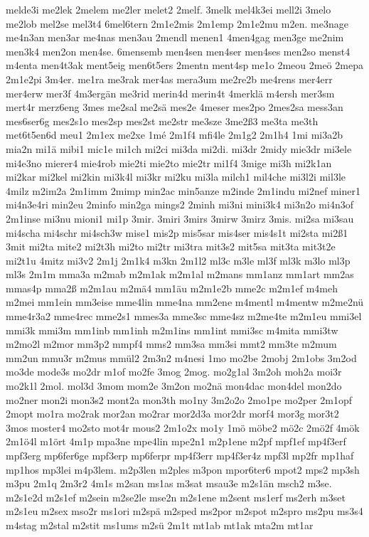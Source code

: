 {melde3i
me2lek
2melem
me2ler
melet2
2melf.
3melk
mel4k3ei
mell2i
3melo
me2lob
mel2se
mel3t4
6mel6tern
2m1e2mis
2m1emp
2m1e2mu
m2en.
me3nage
me4n3an
men3ar
me4nas
men3au
2mendl
menen1
4men4gag
men3ge
me2nim
men3k4
men2on
men4se.
6mensemb
men4sen
men4ser
men4ses
men2so
menst4
m4enta
men4t3ak
ment5eig
men6t5ers
2mentn
ment4sp
me1o
2meou
2meö
2mepa
2m1e2pi
3m4er.
me1ra
me3rak
mer4as
mera3um
me2re2b
me4rens
mer4err
mer4erw
mer3f
4m3ergän
me3rid
merin4d
merin4t
4merklä
m4ersh
mer3sm
mert4r
merz6eng
3mes
me2sal
me2sä
mes2e
4meser
mes2po
2mes2sa
mess3an
mes6ser6g
mes2s1o
mes2sp
mes2st
me2str
me3sze
3me2ß3
me3ta
me3th
met6t5en6d
meu1
2m1ex
me2xe
1mé
2m1f4
mfi4le
2m1g2
2m1h4
1mi
mi3a2b
mia2n
mi1ä
mibi1
mic1e
mi1ch
mi2ci
mi3da
mi2di.
mi3dr
2midy
mie3dr
mi3ele
mi4e3no
mierer4
mie4rob
mie2ti
mie2to
mie2tr
mi1f4
3mige
mi3h
mi2k1an
mi2kar
mi2kel
mi2kin
mi3k4l
mi3kr
mi2ku
mi3la
milch1
mil4che
mi3l2i
mil3le
4milz
m2im2a
2m1imm
2mimp
min2ac
min5anze
m2inde
2m1indu
mi2nef
miner1
mi4n3e4ri
min2eu
2minfo
min2ga
mings2
2minh
mi3ni
mini3k4
mi3n2o
mi4n3of
2m1inse
mi3nu
mioni1
mi1p
3mir.
3miri
3mirs
3mirw
3mirz
3mis.
mi2sa
mi3sau
mi4scha
mi4schr
mi4sch3w
mise1
mis2p
mis5sar
mis4ser
mis4s1t
mi2sta
mi2ß1
3mit
mi2ta
mite2
mi2t3h
mi2to
mi2tr
mi3tra
mit3s2
mit5sa
mit3ta
mit3t2e
mi2t1u
4mitz
mi3v2
2m1j
2m1k4
m3kn
2m1l2
ml3c
m3le
ml3f
ml3k
m3lo
ml3p
ml3s
2m1m
mma3a
m2mab
m2m1ak
m2m1al
m2mans
mm1anz
mm1art
mm2as
mmas4p
mma2ß
m2m1au
m2mä4
mm1äu
m2m1e2b
mme2c
m2m1ef
m4meh
m2mei
mm1ein
mm3eise
mme4lin
mme4na
mm2ene
m4mentl
m4mentw
m2me2nü
mme4r3a2
mme4rec
mme2s1
mmes3a
mme3sc
mme4sz
m2me4te
m2m1eu
mmi3el
mmi3k
mmi3m
mm1inb
mm1inh
m2m1ins
mm1int
mmi3sc
m4mita
mmi3tw
m2mo2l
m2mor
mm3p2
mmpf4
mms2
mm3sa
mm3si
mmt2
mm3te
m2mum
mm2un
mmu3r
m2mus
mmül2
2m3n2
m4nesi
1mo
mo2be
2mobj
2m1obs
3m2od
mo3de
mode3s
mo2dr
m1of
mo2fe
3mog
2mog.
mo2g1al
3m2oh
moh2a
moi3r
mo2k1l
2mol.
mol3d
3mom
mom2e
3m2on
mo2nä
mon4dac
mon4del
mon2do
mo2ner
mon2i
mon3s2
mont2a
mon3th
mo1ny
3m2o2o
2mo1pe
mo2per
2m1opf
2mopt
mo1ra
mo2rak
mor2an
mo2rar
mor2d3a
mor2dr
morf4
mor3g
mor3t2
3mos
moster4
mo2sto
mot4r
mous2
2m1o2x
mo1y
1mö
möbe2
mö2c
2mö2f
4mök
2m1ö4l
m1ört
4m1p
mpa3ne
mpe4lin
mpe2n1
m2p1ene
m2pf
mpf1ef
mp4f3erf
mpf3erg
mp6fer6ge
mpf3erp
mp6ferpr
mp4f3err
mp4f3er4z
mpf3l
mp2fr
mp1haf
mp1hos
mp3lei
m4p3lem.
m2p3len
m2ples
m3pon
mpor6ter6
mpot2
mps2
mp3sh
m3pu
2m1q
2m3r2
4m1s
m2san
ms1as
m3sat
msau3e
m2s1än
msch2
m3se.
m2s1e2d
m2s1ef
m2sein
m2se2le
mse2n
m2s1ene
m2sent
ms1erf
ms2erh
m3set
m2s1eu
m2sex
mso2r
ms1ori
m2spä
m2sped
ms2por
m2spot
m2spro
ms2pu
ms3s4
m4stag
m2stal
m2stit
ms1ums
m2sü
2m1t
mt1ab
mt1ak
mta2m
mt1ar
}
